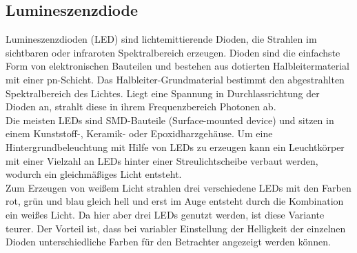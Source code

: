 \subsection{Lumineszenzdiode}
Lumineszenzdioden (LED) sind lichtemittierende Dioden, die Strahlen im sichtbaren oder infraroten Spektralbereich erzeugen. Dioden sind die einfachste Form von elektronischen Bauteilen und bestehen aus dotierten Halbleitermaterial mit einer pn-Schicht. Das Halbleiter-Grundmaterial bestimmt den abgestrahlten Spektralbereich des Lichtes. Liegt eine Spannung in Durchlassrichtung der Dioden an, strahlt diese in ihrem Frequenzbereich Photonen ab. \cite[Vgl. Seite 193 f.]{LofflerMang.2020} \\

Die meisten LEDs sind SMD-Bauteile (Surface-mounted device) und sitzen in einem Kunststoff-, Keramik- oder Epoxidharzgehäuse. 
Um eine Hintergrundbeleuchtung mit Hilfe von LEDs zu erzeugen kann ein Leuchtkörper mit einer Vielzahl an LEDs hinter einer Streulichtscheibe verbaut werden, wodurch ein gleichmäßiges Licht entsteht. \cite[Vgl. Seite 194]{LofflerMang.2020} \\
Zum Erzeugen von weißem Licht strahlen drei verschiedene LEDs mit den Farben rot, grün und blau gleich hell und erst im Auge entsteht durch die Kombination ein weißes Licht. Da hier aber drei LEDs genutzt werden, ist diese Variante teurer. Der Vorteil ist, dass bei variabler Einstellung der Helligkeit der einzelnen Dioden unterschiedliche Farben für den Betrachter angezeigt werden können. \\ 
